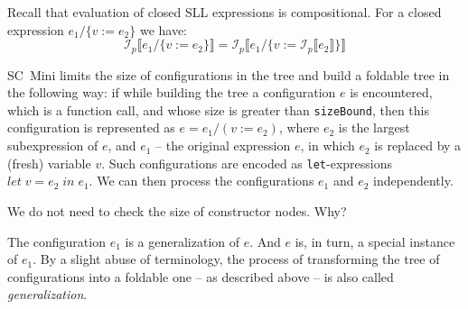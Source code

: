 Recall that evaluation of closed SLL expressions is compositional.
For a closed expression $e_1 / \{v := e_2\}$ we have:
\[\mathcal{I}_p\llbracket e_1 / \{v := e_2\}\rrbracket = \mathcal{I}_p \llbracket e_1 / \{v := \mathcal{I}_p\llbracket e_2\rrbracket\} \rrbracket\]



%


SC~Mini limits the size of configurations in the tree and build a foldable tree in the following way:
if while building the tree a configuration $e$ is encountered, 
which is a function call,
and whose size is greater than \texttt{sizeBound},
then this configuration is represented as $e = e_1 / (v := e_2)$, 
where $e_2$ is the largest subexpression of $e$, and $e_1$ -- 
the original expression $e$, in which $e_2$ is replaced by a (fresh) variable $v$.
Such configurations are encoded as \texttt{let}-expressions $let\;v = e_2 \;in \;e_1$.
We can then process the configurations $e_1$ and $e_2$ independently.

\begin{exercise}
We do not need to check the size of constructor nodes. Why?
\end{exercise}

The configuration $e_1$ is a generalization of $e$. 
And $e$ is, in turn, a special instance of $e_1$.
By a slight abuse of terminology, the process of transforming the
tree of configurations into a foldable one -- as described above --
is also called \emph{generalization}.

